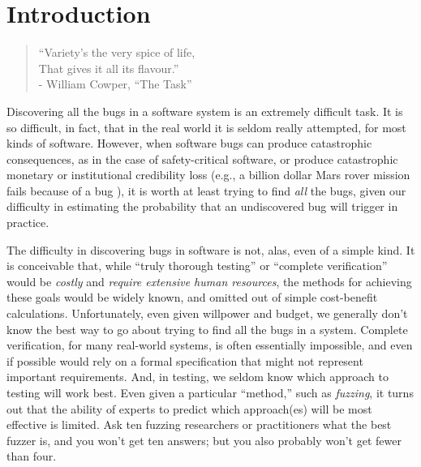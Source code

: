 \documentclass[sigplan,review]{acmart}
\begin{document}



\maketitle

\section{Introduction}

\begin{quote}
  ``Variety's the very spice of life,\\
  That gives it all its flavour.''
  \\ - William Cowper, ``The Task''
  \end{quote}

Discovering all the bugs in a software system is an extremely
difficult task.  It is so difficult, in fact, that in the real world
it is seldom really attempted, for most kinds of software.  However,
when software bugs can produce catastrophic consequences, as in the
case of safety-critical software, or produce catastrophic monetary or
institutional credibility
loss (e.g., a billion dollar Mars rover mission fails because of a bug
\cite{Spirit}), it is worth at least trying to find \emph{all} the bugs,
given our difficulty in estimating the probability that an
undiscovered bug will trigger in practice.

The difficulty in discovering bugs in software is not, alas, even of
a simple kind.  It is conceivable that, while ``truly thorough testing'' or
``complete verification'' would be \emph{costly} and \emph{require
  extensive human resources}, the methods for achieving these goals
would be widely known, and omitted out of simple cost-benefit
calculations.  Unfortunately, even given willpower and budget, we
generally don't know the best way to go about trying to find all the
bugs in a system.  Complete verification, for many real-world systems,
is often essentially impossible, and even if possible would rely on a
formal specification that might not represent important requirements.
And, in testing, we seldom know which approach to testing will work
best.  Even given a particular ``method,'' such as \emph{fuzzing}, it
turns out that the ability of experts to predict which approach(es)
will be most effective is limited.  Ask ten fuzzing researchers or
practitioners what the best fuzzer is, and you won't get ten answers;
but you also probably won't get fewer than four.
\end{document}

